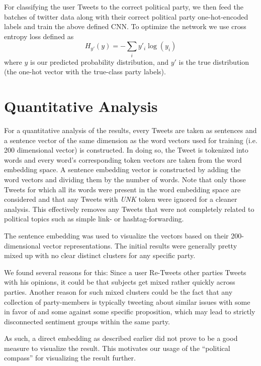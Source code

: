 \documentclass[10pt, oneside]{article}
\begin{document}
\begin{multicols}{2}
For classifying the user Tweets to the correct political party, we then feed the batches of twitter data along with their correct political party one-hot-encoded labels and train the above defined CNN. To optimize the network we use cross entropy loss defined as
\begin{equation}
	H_{y'}(y) = - \sum_{i} y'_{i} \log (y_{i})
\end{equation}
where $y$ is our predicted probability distribution, and $y'$ is the true distribution (the one-hot vector with the true-class party labels). 


\section{Quantitative Analysis}

For a quantitative analysis of the results, every Tweets are taken as sentences and a sentence vector of the same dimension as the word vectors used for training (i.e. 200 dimensional vector) is constructed. In doing so, the Tweet is tokenized into words and every word's corresponding token vectors are taken from the word embedding space. A sentence embedding vector is constructed by adding the word vectors and dividing them by the number of words. Note that only those Tweets for which all its words were present in the word embedding space are considered and that any Tweets with \emph{UNK} token were ignored for a cleaner analysis. This effectively removes any Tweets that were not completely related to political topics such as simple link- or hashtag-forwarding. 

The sentence embedding was used to visualize the vectors based on their 200-dimensional vector representations. The initial results were generally pretty mixed up with no clear distinct clusters for any specific party.

We found several reasons for this:
Since a user Re-Tweets other parties Tweets with his opinions, it could be that subjects get mixed rather quickly across parties.
Another reason for such mixed clusters could be the fact that any collection of party-members is typically tweeting about similar issues with some in favor of and some against some specific proposition, which may lead to strictly disconnected sentiment groups within the same party.

As such, a direct embedding as described earlier did not prove to be a good measure to visualize the result. This motivates our usage of the ``political compass'' \cite{PoliticalCompass2017} for visualizing the result further. 


\end{multicols}
\end{document}
